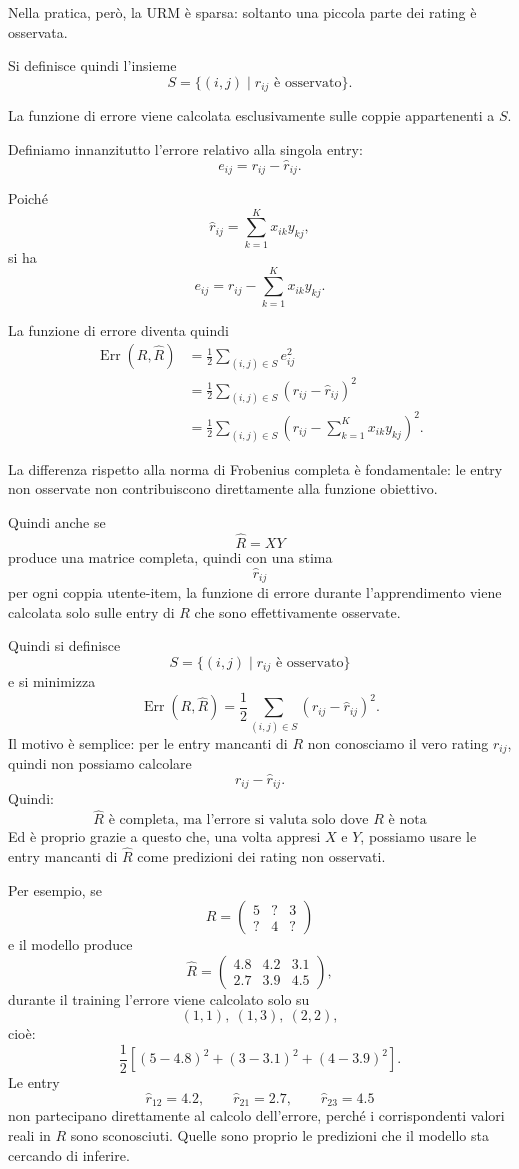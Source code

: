 Nella pratica, però, la URM è sparsa: soltanto una piccola parte dei rating è osservata.

Si definisce quindi l'insieme
\[
S
=
\{(i,j)\mid r_{ij}\text{ è osservato}\}.
\]

La funzione di errore viene calcolata esclusivamente sulle coppie appartenenti a $S$.

Definiamo innanzitutto l'errore relativo alla singola entry:
\[
e_{ij}
=
r_{ij}-\widehat r_{ij}.
\]

Poiché
\[
\widehat r_{ij}
=
\sum_{k=1}^{K}x_{ik}y_{kj},
\]
si ha
\[
e_{ij}
=
r_{ij}
-
\sum_{k=1}^{K}x_{ik}y_{kj}.
\]

La funzione di errore diventa quindi
\begin{align*}
\operatorname{Err}(R,\widehat R)
&=
\frac{1}{2}
\sum_{(i,j)\in S}e_{ij}^{2}\\
&=
\frac{1}{2}
\sum_{(i,j)\in S}
\left(r_{ij}-\widehat r_{ij}\right)^2\\
&=
\frac{1}{2}
\sum_{(i,j)\in S}
\left(
r_{ij}
-
\sum_{k=1}^{K}x_{ik}y_{kj}
\right)^2.
\end{align*}

La differenza rispetto alla norma di Frobenius completa è fondamentale: le entry non osservate non contribuiscono direttamente alla funzione obiettivo.

Quindi anche se 
\[
\hat R = XY
\]
produce una matrice completa, quindi con una stima
\[
\hat r_{ij}
\]
per ogni coppia utente-item, la funzione di errore durante l’apprendimento viene calcolata solo sulle entry di \(R\) che sono effettivamente osservate.

Quindi si definisce
\[
S=\{(i,j)\mid r_{ij}\text{ è osservato}\}
\]
e si minimizza
\[
\operatorname{Err}(R,\hat R)
=
\frac12
\sum_{(i,j)\in S}
(r_{ij}-\hat r_{ij})^2.
\]
Il motivo è semplice: per le entry mancanti di \(R\) non conosciamo il vero rating \(r_{ij}\), quindi non possiamo calcolare
\[
r_{ij}-\hat r_{ij}.
\]
Quindi:
\[
\boxed{\hat R \text{ è completa, ma l'errore si valuta solo dove } R \text{ è nota}}
\]
Ed è proprio grazie a questo che, una volta appresi \(X\) e \(Y\), possiamo usare le entry mancanti di \(\hat R\) come predizioni dei rating non osservati.

Per esempio, se
\[
R=
\begin{pmatrix}
5 & ? & 3\\
? & 4 & ?
\end{pmatrix}
\]
e il modello produce
\[
\hat R=
\begin{pmatrix}
4.8 & 4.2 & 3.1\\
2.7 & 3.9 & 4.5
\end{pmatrix},
\]
durante il training l’errore viene calcolato solo su
\[
(1,1),\ (1,3),\ (2,2),
\]
cioè:
\[
\frac12
\left[
(5-4.8)^2
+
(3-3.1)^2
+
(4-3.9)^2
\right].
\]
Le entry
\[
\hat r_{12}=4.2,\qquad
\hat r_{21}=2.7,\qquad
\hat r_{23}=4.5
\]
non partecipano direttamente al calcolo dell’errore, perché i corrispondenti valori reali in \(R\) sono sconosciuti.
Quelle sono proprio le predizioni che il modello sta cercando di inferire.
